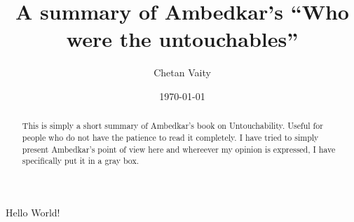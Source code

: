 \documentclass{article}
\begin{document}
\title{A summary of Ambedkar's ``Who were the untouchables''}
\author{Chetan Vaity}
\date{\today}
\maketitle

\begin{abstract}
This is simply a short summary of Ambedkar's book on Untouchability\cite{ambedkar1}. Useful for people who do not have the patience to read it completely. I have tried to simply present Ambedkar's point of view here and whereever my opinion is expressed, I have specifically put it in a gray box.
\end{abstract}

Hello World!



\end{document}

